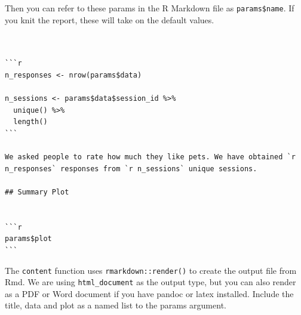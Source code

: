 \documentclass[
  oneside]{book}
\newenvironment{Shaded}{\begin{snugshade}}{\end{snugshade}}
\newcommand{\AttributeTok}[1]{\textcolor[rgb]{0.77,0.63,0.00}{#1}}
\newcommand{\CharTok}[1]{\textcolor[rgb]{0.31,0.60,0.02}{#1}}
\newcommand{\FunctionTok}[1]{\textcolor[rgb]{0.00,0.00,0.00}{#1}}
\newcommand{\KeywordTok}[1]{\textcolor[rgb]{0.13,0.29,0.53}{\textbf{#1}}}
\newcommand{\PreprocessorTok}[1]{\textcolor[rgb]{0.56,0.35,0.01}{\textit{#1}}}
\newcommand{\StringTok}[1]{\textcolor[rgb]{0.31,0.60,0.02}{#1}}
\begin{document}
\begin{Shaded}
\end{Shaded}

Then you can refer to these params in the R Markdown file as \texttt{params\$name}. If you knit the report, these will take on the default values.

\begin{verbatim}


```r
n_responses <- nrow(params$data)

n_sessions <- params$data$session_id %>%
  unique() %>%
  length()
```

We asked people to rate how much they like pets. We have obtained `r n_responses` responses from `r n_sessions` unique sessions.

## Summary Plot


```r
params$plot
```
\end{verbatim}

The \texttt{content} function uses \texttt{rmarkdown::render}\texttt{()} to create the output file from Rmd. We are using \texttt{html\_document} as the output type, but you can also render as a PDF or Word document if you have pandoc or latex installed. Include the \AttributeTok{title}, \AttributeTok{data} and \AttributeTok{plot} as a named list to the \AttributeTok{params} argument.
\end{document}
